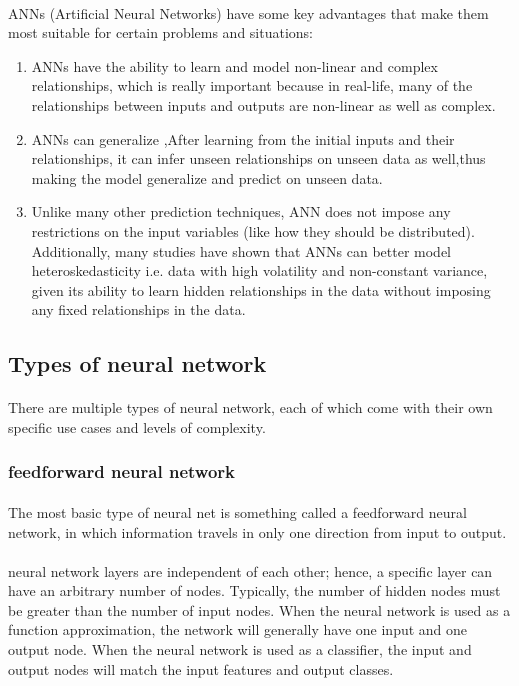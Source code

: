 \paragraph{}
ANNs (Artificial Neural Networks) have some key advantages that make them most suitable for certain problems and situations:
\begin{enumerate}
	\item ANNs have the ability to learn and model non-linear and complex relationships, which is really important because in real-life, many of the relationships between inputs and outputs are non-linear as well as complex.
	\item ANNs can generalize ,After learning from the initial inputs and their relationships, it can infer unseen relationships on unseen data as well,thus making the model generalize and predict on unseen data.
	\item  Unlike many other prediction techniques, ANN does not impose any restrictions on the input variables (like how they should be distributed). Additionally, many studies have shown that ANNs can better model heteroskedasticity i.e. data with high volatility and non-constant variance, given its ability to learn hidden relationships in the data without imposing any fixed relationships in the data. 
	
\end{enumerate}
\subsection{Types of neural network }
\paragraph{}
There are multiple types of neural network, each of which come with their own specific use cases and levels of complexity.
\newline
\subsubsection{\textbf feedforward neural network}

\paragraph{}The most basic type of neural net is something called a feedforward neural network, in which information travels in only one direction from input to output.
\paragraph{}neural network layers are independent of each other; hence, a specific layer can have an arbitrary number of nodes. Typically, the number of hidden nodes must be greater than the number of input nodes. When the neural network is used as a function approximation, the network will generally have one input and one output node. When the neural network is used as a classifier, the input and output nodes will match the input features and output classes.
